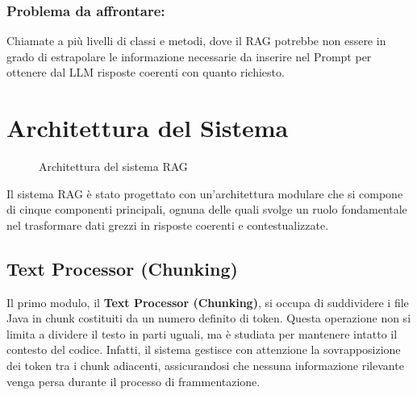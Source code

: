 \documentclass[12pt,a4paper,openright,twoside]{book}
\begin{document}
\subsubsection{Problema da affrontare:}
Chiamate a più livelli di classi e metodi, dove il RAG potrebbe non essere in grado di estrapolare
le informazione necessarie da inserire nel Prompt per ottenere dal LLM risposte coerenti con quanto richiesto.

\section{Architettura del Sistema}
\begin{figure}[H]
    \centering
    \caption{Architettura del sistema RAG}
    \label{fig:rag-architecture}
\end{figure}
Il sistema RAG è stato progettato con un'architettura modulare che si compone di cinque componenti principali,
ognuna delle quali svolge un ruolo fondamentale nel trasformare dati grezzi in risposte coerenti e contestualizzate.
\subsection{Text Processor (Chunking)}
Il primo modulo, il \textbf{Text Processor (Chunking)}, si occupa di suddividere i file Java in chunk costituiti da un numero definito di token. Questa operazione non si limita a dividere il testo in parti uguali, ma è studiata per mantenere intatto il contesto del codice. Infatti, il sistema gestisce con attenzione la sovrapposizione dei token tra i chunk adiacenti, assicurandosi che nessuna informazione rilevante venga persa durante il processo di frammentazione.
\end{document}
